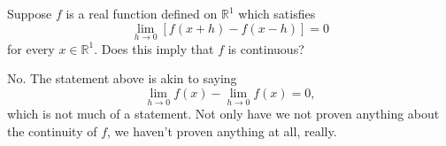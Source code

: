 \begin{exercise}
	Suppose $f$ is a real function defined on $\mathbb{R}^1$ which satisfies
	\begin{equation*}
	\lim\limits_{h \to 0} \left[ f\left(x+h\right) - f\left(x-h\right) \right] = 0
	\end{equation*}
	for every $x \in \mathbb{R}^1$. Does this imply that $f$ is continuous?
\end{exercise}
\begin{solution}
	No. The statement above is akin to saying
	\begin{equation*}
	\lim\limits_{h \to 0} f\left(x\right) - \lim\limits_{h \to 0} f\left(x\right) = 0,
	\end{equation*}
	which is not much of a statement. Not only have we not proven anything about the continuity of $f$, we haven't proven anything at all, really.
\end{solution}
